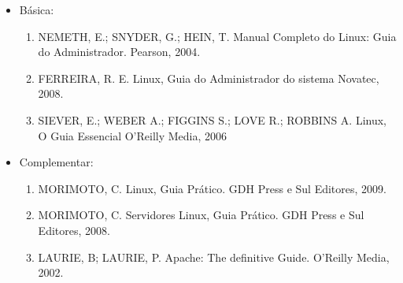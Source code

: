 \begin{itemize} 

\item Básica:
    \begin{enumerate}

    \item NEMETH, E.; SNYDER, G.; HEIN, T.
          Manual Completo do Linux: Guia do Administrador.
          Pearson, 2004.
    
    \item FERREIRA, R. E.
          Linux, Guia do Administrador do sistema
          Novatec, 2008.
    
    \item SIEVER, E.; WEBER A.; FIGGINS S.; LOVE R.; ROBBINS A.
          Linux, O Guia Essencial
          O'Reilly Media, 2006
	
    \end{enumerate}

\item Complementar:
	\begin{enumerate} 

    \item MORIMOTO, C.
          Linux, Guia Prático.
          GDH Press e Sul Editores, 2009.

    \item MORIMOTO, C.
          Servidores Linux, Guia Prático.
          GDH Press e Sul Editores, 2008.

    \item LAURIE, B; LAURIE, P.
          Apache: The definitive Guide.
          O'Reilly Media, 2002.

	\end{enumerate}

\end{itemize}


